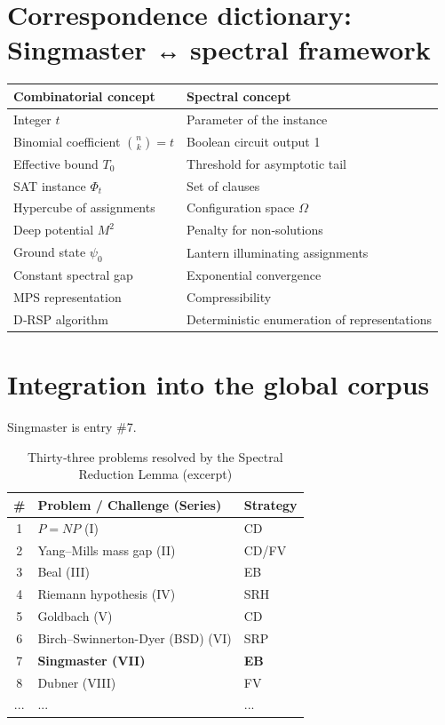 \documentclass[11pt,a4paper]{article}
\begin{document}
\section{Correspondence dictionary: Singmaster ↔ spectral framework}

\begin{center}
\small
\begin{tabular}{@{}l|l@{}}
\toprule
\textbf{Combinatorial concept} & \textbf{Spectral concept} \\
\midrule
Integer $t$ & Parameter of the instance \\
Binomial coefficient $\binom{n}{k}=t$ & Boolean circuit output 1 \\
Effective bound $T_0$ & Threshold for asymptotic tail \\
SAT instance $\Phi_t$ & Set of clauses \\
Hypercube of assignments & Configuration space $\Omega$ \\
Deep potential $M^2$ & Penalty for non‑solutions \\
Ground state $\psi_0$ & Lantern illuminating assignments \\
Constant spectral gap & Exponential convergence \\
MPS representation & Compressibility \\
D‑RSP algorithm & Deterministic enumeration of representations \\
\bottomrule
\end{tabular}
\end{center}

\section{Integration into the global corpus}

Singmaster is entry \#7.

\begin{center}
\small
\begin{longtable}{@{}cll@{}}
\caption{Thirty‑three problems resolved by the Spectral Reduction Lemma (excerpt)}\\
\toprule
\# & Problem / Challenge (Series) & Strategy \\
\midrule
1 & \(P = NP\) (I) & CD \\
2 & Yang–Mills mass gap (II) & CD/FV \\
3 & Beal (III) & EB \\
4 & Riemann hypothesis (IV) & SRH \\
5 & Goldbach (V) & CD \\
6 & Birch–Swinnerton-Dyer (BSD) (VI) & SRP \\
7 & \textbf{Singmaster (VII)} & \textbf{EB} \\
8 & Dubner (VIII) & FV \\
... & ... & ... \\
\bottomrule
\end{longtable}
\end{center}
\end{document}
